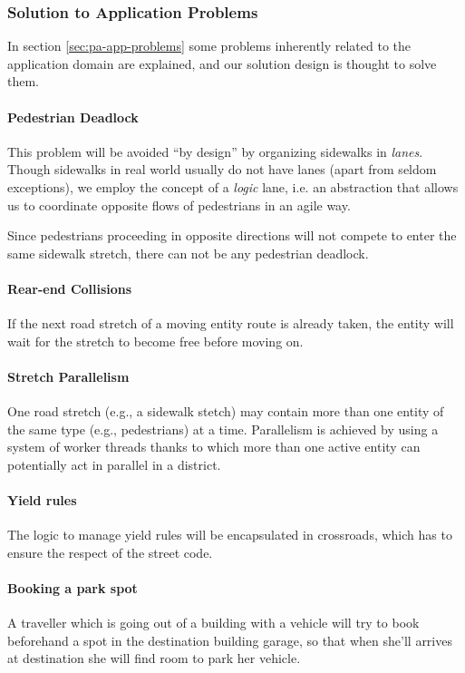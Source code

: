 
\subsubsection{Solution to Application Problems}

In section \ref{sec:pa-app-problems} some problems inherently related to the
application domain are explained, and our solution design is thought to solve
them.

\paragraph{Pedestrian Deadlock}
This problem will be avoided ``by design'' by organizing sidewalks in
\textit{lanes}. Though sidewalks in real world usually do not have lanes (apart
from seldom exceptions), we employ the concept of a \textit{logic} lane, i.e.
an abstraction that allows us to coordinate opposite flows of pedestrians in an
agile way.

Since pedestrians proceeding in opposite directions will not compete to enter
the same sidewalk stretch, there can not be any pedestrian deadlock.

\paragraph{Rear-end Collisions}
If the next road stretch of a moving entity route is already taken, the entity
will wait for the stretch to become free before moving on.

\paragraph{Stretch Parallelism}
One road stretch (e.g., a sidewalk stetch) may contain more than one entity of
the same type (e.g., pedestrians) at a time.
Parallelism is achieved by using a system of worker threads thanks to which
more than one active entity can potentially act in parallel in a district.

\paragraph{Yield rules}
The logic to manage yield rules will be encapsulated in crossroads, which has
to ensure the respect of the street code.

\paragraph{Booking a park spot}
A traveller which is going out of a building with a vehicle will try to book
beforehand a spot in the destination building garage, so that when she'll
arrives at destination she will find room to park her vehicle.

